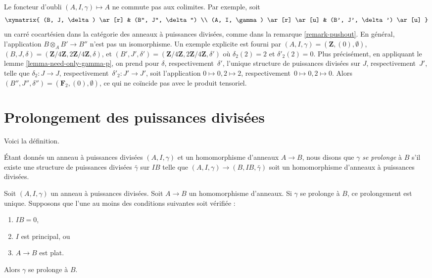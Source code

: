 \begin{remark}
\label{remark-forgetful}
Le foncteur d'oubli $(A, I, \gamma) \mapsto A$ ne commute pas aux
colimites. Par exemple, soit
$$
\xymatrix{
(B, J, \delta) \ar[r] & (B'', J'', \delta'') \\
(A, I, \gamma) \ar[r] \ar[u] & (B', J', \delta') \ar[u]
}
$$
un carré cocartésien dans la catégorie des anneaux à puissances divisées, comme dans
la remarque \ref{remark-pushout}. En général, l'application
$B \otimes_A B' \to B''$ n'est pas un
isomorphisme. Un exemple explicite est fourni par
$(A, I, \gamma) = (\mathbf{Z}, (0), \emptyset)$,
$(B, J, \delta) = (\mathbf{Z}/4\mathbf{Z}, 2\mathbf{Z}/4\mathbf{Z}, \delta)$,
et
$(B', J', \delta') =
(\mathbf{Z}/4\mathbf{Z}, 2\mathbf{Z}/4\mathbf{Z}, \delta')$
où $\delta_2(2) = 2$ et $\delta'_2(2) = 0$.
Plus précisément, en appliquant le lemme \ref{lemma-need-only-gamma-p}, on
prend pour $\delta$, respectivement\ $\delta'$, l'unique
structure de puissances divisées sur $J$, respectivement\ $J'$, telle que
$\delta_2 : J \to J$, respectivement\ $\delta'_2 : J' \to J'$,
soit l'application $0 \mapsto 0, 2 \mapsto 2$, respectivement\ $0 \mapsto 0, 2 \mapsto 0$.
Alors $(B'', J'', \delta'') = (\mathbf{F}_2, (0), \emptyset)$,
ce qui ne coïncide pas avec le produit tensoriel.
\end{remark}


\section{Prolongement des puissances divisées}
\label{section-extend}

\noindent
Voici la définition.

\begin{definition}
\label{definition-extends} Étant
donnés un anneau à puissances divisées $(A, I, \gamma)$ et un homomorphisme d'anneaux
$A \to B$, nous disons que $\gamma$ {\it se prolonge} à $B$ s'il existe une
structure de puissances divisées $\bar\gamma$ sur $IB$ telle que
$(A, I, \gamma) \to (B, IB, \bar\gamma)$ soit un homomorphisme
d'anneaux à puissances divisées.
\end{definition}

\begin{lemma}
\label{lemma-gamma-extends}
Soit $(A, I, \gamma)$ un anneau à puissances divisées.
Soit $A \to B$ un homomorphisme
d'anneaux. Si $\gamma$ se prolonge à $B$, ce prolongement est unique.
Supposons que l'une au moins des conditions suivantes soit vérifiée :
\begin{enumerate}
\item $IB = 0$,
\item $I$ est principal, ou
\item $A \to B$ est plat.
\end{enumerate}
Alors $\gamma$ se prolonge à $B$.
\end{lemma}

